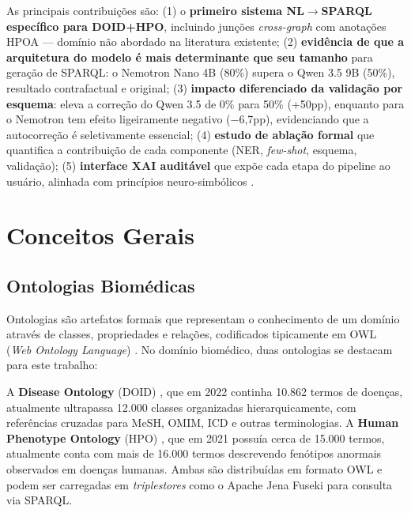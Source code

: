 \documentclass[12pt]{article}
\begin{document}
As principais contribui\c{c}\~{o}es s\~{a}o: (1) o \textbf{primeiro sistema NL$\rightarrow$SPARQL espec\'{i}fico para DOID+HPO}, incluindo jun\c{c}\~{o}es \textit{cross-graph} com anota\c{c}\~{o}es HPOA --- dom\'{i}nio n\~{a}o abordado na literatura existente; (2) \textbf{evid\^{e}ncia de que a arquitetura do modelo \'{e} mais determinante que seu tamanho} para gera\c{c}\~{a}o de SPARQL: o Nemotron Nano 4B (80\%) supera o Qwen 3.5 9B (50\%), resultado contrafactual e original; (3) \textbf{impacto diferenciado da valida\c{c}\~{a}o por esquema}: eleva a corre\c{c}\~{a}o do Qwen 3.5 de 0\% para 50\% (+50pp), enquanto para o Nemotron tem efeito ligeiramente negativo ($-$6,7pp), evidenciando que a autocorre\c{c}\~{a}o \'{e} seletivamente essencial; (4) \textbf{estudo de abla\c{c}\~{a}o formal} que quantifica a contribui\c{c}\~{a}o de cada componente (NER, \textit{few-shot}, esquema, valida\c{c}\~{a}o); (5) \textbf{interface XAI audit\'{a}vel} que exp\~{o}e cada etapa do pipeline ao usu\'{a}rio, alinhada com princ\'{i}pios neuro-simb\'{o}licos \cite{prenosil2025neurosymbolic}.

\section{Conceitos Gerais}
\label{sec:conceitos}

\subsection{Ontologias Biom\'{e}dicas}
\label{sec:ontologias}

Ontologias s\~{a}o artefatos formais que representam o conhecimento de um dom\'{i}nio atrav\'{e}s de classes, propriedades e rela\c{c}\~{o}es, codificados tipicamente em OWL (\textit{Web Ontology Language}) \cite{hogan2021knowledge}. No dom\'{i}nio biom\'{e}dico, duas ontologias se destacam para este trabalho:

A \textbf{Disease Ontology} (DOID) \cite{schriml2022doid}, que em 2022 continha 10.862 termos de doen\c{c}as, atualmente ultrapassa 12.000 classes organizadas hierarquicamente, com refer\^{e}ncias cruzadas para MeSH, OMIM, ICD e outras terminologias. A \textbf{Human Phenotype Ontology} (HPO) \cite{kohler2021hpo}, que em 2021 possu\'{i}a cerca de 15.000 termos, atualmente conta com mais de 16.000 termos descrevendo fen\'{o}tipos anormais observados em doen\c{c}as humanas. Ambas s\~{a}o distribu\'{i}das em formato OWL e podem ser carregadas em \textit{triplestores} como o Apache Jena Fuseki para consulta via SPARQL.
\end{document}
